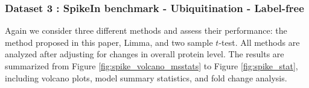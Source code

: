 \documentclass{mcp}
\begin{document}
\clearpage
\subsubsection{Dataset 3 : SpikeIn benchmark - Ubiquitination - Label-free}
\label{sec:benchmark}



Again we consider three different methods and assess their performance: the method proposed in this paper, Limma, and two sample $t$-test. All methods are analyzed after adjusting for changes in overall protein level. The results are summarized from Figure \ref{fig:spike_volcano_msstats} to Figure \ref{fig:spike_stat}, including volcano plots, model summary statistics, and fold change analysis.
\end{document}
